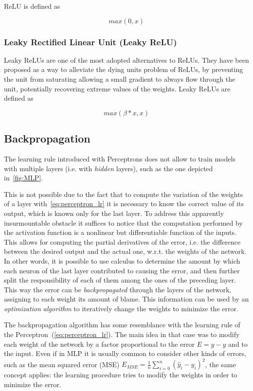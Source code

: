 ReLU is defined as

\begin{equation}\label{eq:fn_composition}
    max(0, x)
\end{equation}

\subsubsection{Leaky Rectified Linear Unit (Leaky ReLU)}\label{sec:LReLU}
Leaky ReLUs are one of the most adopted alternatives to ReLUs. They have been
proposed as a way to alleviate the dying units problem of ReLUs, by preventing
the unit from saturating allowing a small gradient to always flow through the
unit, potentially recovering extreme values of the weights. Leaky ReLUs are
defined as

\begin{equation}\label{eq:fn_composition}
    max(\beta*x, x)
\end{equation}

\subsection{Backpropagation}\label{sec:backprop}
The learning rule introduced with Perceptrons does not allow to train models
with multiple layers (i.e. with \emph{hidden} layers), such as the one depicted
in~\autoref{fig:MLP}.

This is not possible due to the fact that to compute the variation of the
weights of a layer with~\autoref{eq:perceptron_lr} it is necessary to know the
correct value of its output, which is known only for the last layer. To address
this apparently insurmountable obstacle it suffices to notice that the
computation performed by the activation function is a nonlinear but
differentiable function of the inputs. This allows for computing the
partial derivatives of the error, i.e. the difference between the desired
output and the actual one, w.r.t. the weights of the network. In other words,
it is possible to use calculus to determine the amount by which each neuron of
the last layer contributed to causing the error, and then further split the
responsibility of each of them among the ones of the preceding layer. This way
the error can be \emph{backpropagated} through the layers of the network,
assigning to each weight its amount of blame. This information can be used by
an \emph{optimization algorithm} to iteratively change the weights to minimize
the error.

The backpropagation algorithm has some resemblance with the learning rule of
the Perceptron~(\autoref{eq:perceptron_lr}). The main idea in that case was
to modify each weight of the network by a factor proportional to the error $E =
\hat y - y$ and to the input. Even if in MLP it is usually common to consider
other kinds of errors, such as the mean squared error (MSE) $E_{MSE} =
\frac{1}{n} \sum_{i=0}^n(\hat y_i - y_i)^2$, the same concept applies: the
learning procedure tries to modify the weights in order to minimize the error.

